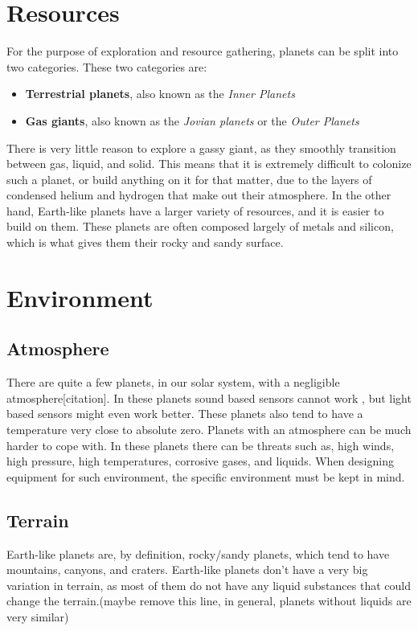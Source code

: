 \clearpage

\section{Resources}
For the purpose of exploration and resource gathering, planets can be split into two categories. These two categories are:\cite{planettypes}
\begin{itemize}
	\item{\textbf{Terrestrial planets}, also known as the \textit{Inner Planets}}
	\item{\textbf{Gas giants}, also known as the \textit{Jovian planets} or the \textit{Outer Planets}}
\end{itemize}

There is very little reason to explore a gassy giant, as they smoothly transition between gas, liquid, and solid. This means that it is extremely difficult to colonize such a planet, or build anything on it for that matter, due to the layers of condensed helium and hydrogen that make out their atmosphere\cite{outerplanetatmosphere}.
In the other hand, Earth-like planets have a larger variety of resources, and it is easier to build on them. These planets are often composed largely of metals and silicon, which is what gives them their rocky and sandy surface.

\section{Environment}
\subsection{Atmosphere}
There are quite a few planets, in our solar system, with a negligible atmosphere[citation]. In these planets sound based sensors cannot work
, but light based sensors might even work better. These planets also tend to have a temperature very close to absolute zero\cite{planetstemp}.
Planets with an atmosphere can be much harder to cope with. In these planets there can be threats such as, high winds, high pressure, high temperatures, corrosive gases, and liquids. When designing equipment for such environment, the specific environment must be kept in mind.

\subsection{Terrain}
Earth-like planets are, by definition, rocky/sandy planets, which tend to have mountains, canyons, and craters.
Earth-like planets don't have a very big variation in terrain, as most of them do not have any liquid substances that could change the terrain.(maybe remove this line, in general, planets without liquids are very similar)

